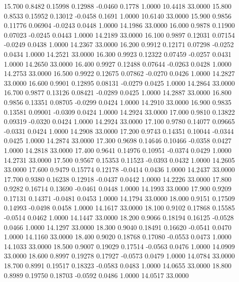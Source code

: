   15.700   0.8482   0.15998   0.12988  -0.0460   0.1778   1.0000  10.4418  33.0000
  15.800   0.8533   0.15952   0.13012  -0.0458   0.1691   1.0000  10.6140  33.0000
  15.900   0.9856   0.11776   0.06904  -0.0243   0.0448   1.0000  14.1986  33.0000
  16.000   0.9878   0.11900   0.07023  -0.0245   0.0443   1.0000  14.2189  33.0000
  16.100   0.9897   0.12031   0.07154  -0.0249   0.0438   1.0000  14.2367  33.0000
  16.200   0.9912   0.12171   0.07298  -0.0252   0.0434   1.0000  14.2521  33.0000
  16.300   0.9923   0.12322   0.07459  -0.0257   0.0431   1.0000  14.2650  33.0000
  16.400   0.9927   0.12488   0.07644  -0.0263   0.0428   1.0000  14.2753  33.0000
  16.500   0.9922   0.12675   0.07862  -0.0270   0.0426   1.0000  14.2827  33.0000
  16.600   0.9901   0.12895   0.08131  -0.0279   0.0425   1.0000  14.2864  33.0000
  16.700   0.9877   0.13126   0.08421  -0.0289   0.0425   1.0000  14.2887  33.0000
  16.800   0.9856   0.13351   0.08705  -0.0299   0.0424   1.0000  14.2910  33.0000
  16.900   0.9835   0.13581   0.09001  -0.0309   0.0424   1.0000  14.2924  33.0000
  17.000   0.9810   0.13822   0.09319  -0.0320   0.0424   1.0000  14.2924  33.0000
  17.100   0.9780   0.14077   0.09665  -0.0331   0.0424   1.0000  14.2908  33.0000
  17.200   0.9743   0.14351   0.10044  -0.0344   0.0425   1.0000  14.2874  33.0000
  17.300   0.9698   0.14646   0.10466  -0.0358   0.0427   1.0000  14.2818  33.0000
  17.400   0.9641   0.14976   0.10951  -0.0374   0.0429   1.0000  14.2731  33.0000
  17.500   0.9567   0.15353   0.11523  -0.0393   0.0432   1.0000  14.2605  33.0000
  17.600   0.9479   0.15774   0.12178  -0.0414   0.0436   1.0000  14.2437  33.0000
  17.700   0.9380   0.16238   0.12918  -0.0437   0.0442   1.0000  14.2226  33.0000
  17.800   0.9282   0.16714   0.13690  -0.0461   0.0448   1.0000  14.1993  33.0000
  17.900   0.9209   0.17131   0.14371  -0.0481   0.0453   1.0000  14.1794  33.0000
  18.000   0.9151   0.17509   0.14993  -0.0498   0.0458   1.0000  14.1617  33.0000
  18.100   0.9102   0.17868   0.15585  -0.0514   0.0462   1.0000  14.1447  33.0000
  18.200   0.9066   0.18194   0.16125  -0.0528   0.0466   1.0000  14.1297  33.0000
  18.300   0.9040   0.18491   0.16620  -0.0541   0.0470   1.0000  14.1160  33.0000
  18.400   0.9020   0.18768   0.17080  -0.0553   0.0473   1.0000  14.1033  33.0000
  18.500   0.9007   0.19029   0.17514  -0.0563   0.0476   1.0000  14.0909  33.0000
  18.600   0.8997   0.19278   0.17927  -0.0573   0.0479   1.0000  14.0784  33.0000
  18.700   0.8991   0.19517   0.18323  -0.0583   0.0483   1.0000  14.0655  33.0000
  18.800   0.8989   0.19750   0.18703  -0.0592   0.0486   1.0000  14.0517  33.0000
